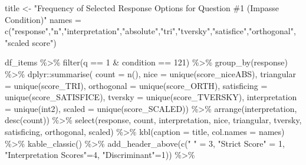 \documentclass[
  letterpaper,
  DIV=11,
  numbers=noendperiod]{scrreprt}
\newenvironment{Shaded}{\begin{snugshade}}{\end{snugshade}}
\newcommand{\AttributeTok}[1]{\textcolor[rgb]{0.40,0.45,0.13}{#1}}
\newcommand{\DecValTok}[1]{\textcolor[rgb]{0.68,0.00,0.00}{#1}}
\newcommand{\FunctionTok}[1]{\textcolor[rgb]{0.28,0.35,0.67}{#1}}
\newcommand{\NormalTok}[1]{\textcolor[rgb]{0.00,0.23,0.31}{#1}}
\newcommand{\OtherTok}[1]{\textcolor[rgb]{0.00,0.23,0.31}{#1}}
\newcommand{\SpecialCharTok}[1]{\textcolor[rgb]{0.37,0.37,0.37}{#1}}
\newcommand{\StringTok}[1]{\textcolor[rgb]{0.13,0.47,0.30}{#1}}
\begin{document}
\begin{Shaded}
\begin{Highlighting}[]
\NormalTok{title }\OtherTok{\textless{}{-}} \StringTok{"Frequency of Selected Response Options for Question \#1 (Impasse Condition)"}
\NormalTok{names }\OtherTok{=} \FunctionTok{c}\NormalTok{(}\StringTok{"response"}\NormalTok{,}\StringTok{"n"}\NormalTok{,}\StringTok{"interpretation"}\NormalTok{,}\StringTok{"absolute"}\NormalTok{,}\StringTok{"tri"}\NormalTok{,}\StringTok{"tversky"}\NormalTok{,}\StringTok{"satisfice"}\NormalTok{,}\StringTok{"orthogonal"}\NormalTok{, }\StringTok{"scaled score"}\NormalTok{)}

\NormalTok{df\_items }\SpecialCharTok{\%\textgreater{}\%} \FunctionTok{filter}\NormalTok{(q }\SpecialCharTok{==} \DecValTok{1} \SpecialCharTok{\&}\NormalTok{ condition }\SpecialCharTok{==} \DecValTok{121}\NormalTok{) }\SpecialCharTok{\%\textgreater{}\%} \FunctionTok{group\_by}\NormalTok{(response) }\SpecialCharTok{\%\textgreater{}\%} 
\NormalTok{  dplyr}\SpecialCharTok{::}\FunctionTok{summarise}\NormalTok{( }\AttributeTok{count =} \FunctionTok{n}\NormalTok{(), }
                    \AttributeTok{nice =} \FunctionTok{unique}\NormalTok{(score\_niceABS),}
                    \AttributeTok{triangular =} \FunctionTok{unique}\NormalTok{(score\_TRI), }
                    \AttributeTok{orthogonal =}  \FunctionTok{unique}\NormalTok{(score\_ORTH),}
                    \AttributeTok{satisficing =}  \FunctionTok{unique}\NormalTok{(score\_SATISFICE),}
                    \AttributeTok{tversky =} \FunctionTok{unique}\NormalTok{(score\_TVERSKY),}
                    \AttributeTok{interpretation =} \FunctionTok{unique}\NormalTok{(int2),}
                    \AttributeTok{scaled =} \FunctionTok{unique}\NormalTok{(score\_SCALED)) }\SpecialCharTok{\%\textgreater{}\%} 
  \FunctionTok{arrange}\NormalTok{(interpretation, }\FunctionTok{desc}\NormalTok{(count)) }\SpecialCharTok{\%\textgreater{}\%} 
  \FunctionTok{select}\NormalTok{(response, count, interpretation, nice, }
\NormalTok{         triangular, tversky, satisficing, orthogonal, scaled) }\SpecialCharTok{\%\textgreater{}\%} 
  \FunctionTok{kbl}\NormalTok{(}\AttributeTok{caption =}\NormalTok{ title, }\AttributeTok{col.names =}\NormalTok{ names) }\SpecialCharTok{\%\textgreater{}\%}  \FunctionTok{kable\_classic}\NormalTok{() }\SpecialCharTok{\%\textgreater{}\%} 
  \FunctionTok{add\_header\_above}\NormalTok{(}\FunctionTok{c}\NormalTok{(}\StringTok{" "} \OtherTok{=} \DecValTok{3}\NormalTok{, }\StringTok{"Strict Score"} \OtherTok{=} \DecValTok{1}\NormalTok{, }\StringTok{"Interpretation Scores"}\OtherTok{=}\DecValTok{4}\NormalTok{, }\StringTok{"Discriminant"}\OtherTok{=}\DecValTok{1}\NormalTok{)) }\SpecialCharTok{\%\textgreater{}\%}

\end{Highlighting}
\end{Shaded}
\end{document}
